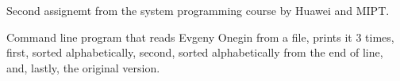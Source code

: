 Second assignemt from the system programming course by Huawei and MIPT.

Command line program that reads Evgeny Onegin from a file, prints it 3 times, first, sorted alphabetically, second, sorted alphabetically from the end of line, and, lastly, the original version. 